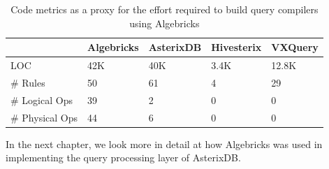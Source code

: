 \begin{table}
\begin{center}
\begin{tabular}{|l|l|l|l|l|}
\hline
 & Algebricks & AsterixDB & Hivesterix & VXQuery \\
\hline
\hline
LOC & 42K & 40K & 3.4K & 12.8K \\
\hline
\# Rules & 50 & 61 & 4 & 29 \\
\hline
\# Logical Ops & 39 & 2 & 0 & 0 \\
\hline
\# Physical Ops & 44 & 6 & 0 & 0 \\
\hline
\end{tabular}
\caption{Code metrics as a proxy for the effort required to build query compilers using Algebricks}\label{tbl:codemetrics}
\end{center}
\end{table}

In the next chapter, we look more in detail at how Algebricks was used in implementing the query processing layer of AsterixDB.

